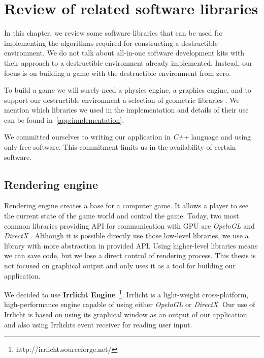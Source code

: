 \chapter{Review of related software libraries}
\label{chapt:technology}
In this chapter, we review some software libraries that can be used for implementing the algorithms required for constructing a destructible environment. We do not talk about all-in-one software development kits with their approach to a destructible environment already implemented. Instead, our focus is on building a game with the destructible environment from zero. 

To build a game we will surely need a physics engine, a graphics engine, and to support our destructible environment a selection of geometric libraries . We mention which libraries we used in the implementation and details of their use can be found in~\cref{app:implementation}.

We committed ourselves to writing our application in \emph{C++} language and using only free software. This commitment limits us in the availability of certain software. 

\section{Rendering engine}
Rendering engine creates a base for a computer game. It allows a player to see the current state of the game world and control the game.  Today, two most common libraries providing API for communication with GPU are \emph{OpelnGL} and \emph{DirectX} . Although it is possible directly use those low-level libraries, we use a library with more abstraction in provided API. Using higher-level libraries means we can save code, but we lose a direct control of rendering process. This thesis is not focused on graphical output and only uses it as a tool for building our application.

We decided to use \textbf{Irrlicht Engine}~\footnote{http://irrlicht.sourceforge.net/}. Irrlicht is a light-weight cross-platform, high-performance engine capable of using either  \emph{OpelnGL} or \emph{DirectX}. Our use of Irrlicht is based on using its graphical window as an output of our application and also using Irrlichts event receiver for reading user input.

